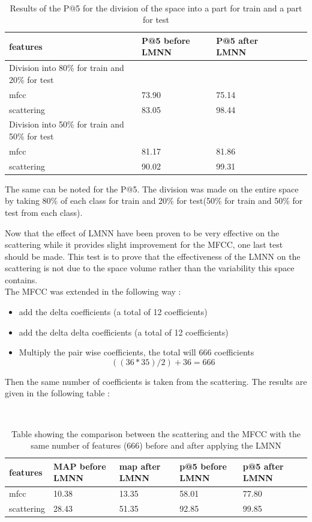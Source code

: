\documentclass[hidelinks,12pt]{report}
\begin{document}
\begin{table} [H]
\begin{center} 
\ 
 \setlength{\tabcolsep}{.16667em} 
\begin{tabular}{ | l | l | l | l | l |l|}
\hline
features & P@5 before LMNN & P@5 after LMNN  \\ 
\hline 
Division into 80\% for train and 20\% for test \\
\hline
mfcc & 73.90& 75.14  \\ 
scattering &83.05& 98.44    \\ 
\hline
Division into 50\% for train and 50\% for test \\
\hline
mfcc & 81.17& 81.86  \\ 
scattering & 90.02 & 99.31  \\ 
\hline
\end{tabular} 
\end{center} 
\caption{Results of the P@5 for the division of the space into a part for train and a part for test} 
\label{you} 
\end{table} 
The same can be noted for the P@5. The division was made on the entire space by taking 80\% of each class for train and 20\% for test(50\% for train and 50\% for test from each class). \par
Now that the effect of LMNN have been proven to be very effective on the scattering while it provides slight improvement for the MFCC, one last test should be made. This test is to prove that the effectiveness of the LMNN on the scattering is not due to the space volume rather than the variability this space contains. \\
The MFCC was extended in the following way :
\begin{itemize}
\item add the delta coefficients (a total of 12 coefficients) 
\item add the delta delta coefficients (a total of 12 coefficients)
\item Multiply the pair wise coefficients, the total will 666 coefficients $$((36*35)/2)+36=666$$
\end{itemize}
Then the same number of coefficients is taken from the scattering. The results are given in the following table : 
\begin{table} [H]
\begin{center} 
\ 
 \setlength{\tabcolsep}{.16667em} 
\begin{tabular}{ | l | l | l | l | l | l |}
\hline
features & MAP before LMNN& map after LMNN & p@5 before LMNN & p@5 after LMNN \\ 
\hline 
mfcc & 10.38 & 13.35 & 58.01 & 77.80 \\ 
scattering & 28.43 & 51.35 & 92.85 & 99.85  \\ 
\hline
\end{tabular} 
\end{center} 
\caption{Table showing the comparison between the scattering and the MFCC with the same number of features (666) before and after applying the LMNN} 
\label{you} 
\end{table} 
\end{document}

